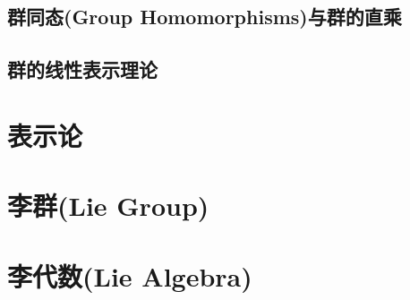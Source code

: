 \documentclass{article}
\begin{document}
\newpage
\subsection{群同态(Group Homomorphisms)与群的直乘}


\subsection{群的线性表示理论}









\section{表示论}



\section{李群(Lie Group)}




\section{李代数(Lie Algebra)}
\end{document}
